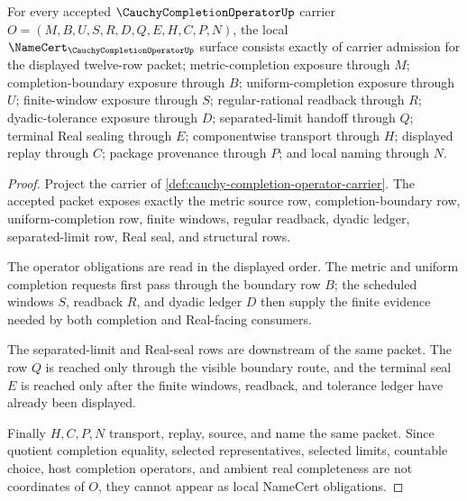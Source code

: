 \begin{theorem}
\label{thm:cauchy-completion-operator-namecert-obligation-surface}
For every accepted $\CauchyCompletionOperatorUp$ carrier $O=(M,B,U,S,R,D,Q,E,H,C,P,N)$, the local $\NameCert_{\CauchyCompletionOperatorUp}$ surface consists exactly of carrier admission for the displayed twelve-row packet; metric-completion exposure through $M$; completion-boundary exposure through $B$; uniform-completion exposure through $U$; finite-window exposure through $S$; regular-rational readback through $R$; dyadic-tolerance exposure through $D$; separated-limit handoff through $Q$; terminal Real sealing through $E$; componentwise transport through $H$; displayed replay through $C$; package provenance through $P$; and local naming through $N$.
\end{theorem}
\begin{proof}
Project the carrier of \autoref{def:cauchy-completion-operator-carrier}. The accepted packet exposes exactly the metric source row, completion-boundary row, uniform-completion row, finite windows, regular readback, dyadic ledger, separated-limit row, Real seal, and structural rows.

The operator obligations are read in the displayed order. The metric and uniform completion requests first pass through the boundary row $B$; the scheduled windows $S$, readback $R$, and dyadic ledger $D$ then supply the finite evidence needed by both completion and Real-facing consumers.

The separated-limit and Real-seal rows are downstream of the same packet. The row $Q$ is reached only through the visible boundary route, and the terminal seal $E$ is reached only after the finite windows, readback, and tolerance ledger have already been displayed.

Finally $H,C,P,N$ transport, replay, source, and name the same packet. Since quotient completion equality, selected representatives, selected limits, countable choice, host completion operators, and ambient real completeness are not coordinates of $O$, they cannot appear as local NameCert obligations.
\end{proof}

